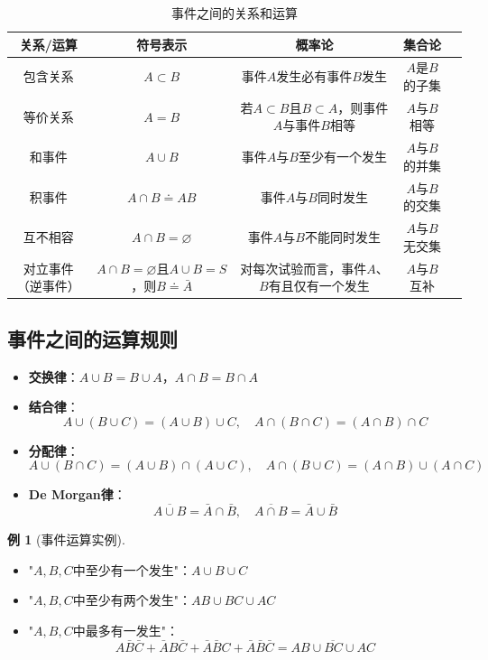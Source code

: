 \documentclass[11pt,a4paper]{report}
\theoremstyle{definition}
\newtheorem{example}{例}[chapter]
\theoremstyle{plain}
\begin{document}
\begin{table}[htbp]
\centering
\caption{事件之间的关系和运算}
\begin{tabular}{@{}ccccc@{}}
\toprule
\textbf{关系/运算} & \textbf{符号表示} & \textbf{概率论} & \textbf{集合论}\\
\midrule
包含关系 & $A\subset B$ & 事件$A$发生必有事件$B$发生 & $A$是$B$的子集\\
等价关系 & $A=B$ & 若$A\subset B$且$B\subset A$，则事件$A$与事件$B$相等 & $A$与$B$相等\\
和事件 & $A\cup B$ & 事件$A$与$B$至少有一个发生 & $A$与$B$的并集\\
积事件 & $A\cap B\doteq AB$ & 事件$A$与$B$同时发生 & $A$与$B$的交集\\
互不相容 & $A\cap B=\varnothing$ & 事件$A$与$B$不能同时发生 & $A$与$B$无交集\\
对立事件（逆事件） & $A\cap B=\varnothing$且$A\cup B=S$，则$B\doteq\bar{A}$ & 对每次试验而言，事件$A$、$B$有且仅有一个发生 & $A$与$B$互补\\
\bottomrule
\end{tabular}
\end{table}

\subsection{事件之间的运算规则}

\begin{itemize}[leftmargin=2em]
    \item \textbf{交换律}：$A\cup B=B\cup A$，$A\cap B=B\cap A$
    \item \textbf{结合律}：
    \[
    A\cup(B\cup C)=(A\cup B)\cup C,\quad A\cap(B\cap C)=(A\cap B)\cap C
    \]
    \item \textbf{分配律}：
    \[
    A\cup(B\cap C)=(A\cup B)\cap(A\cup C),\quad A\cap(B\cup C)=(A\cap B)\cup(A\cap C)
    \]
    \item \textbf{De Morgan律}：
    \[
    \overline{A\cup B}=\bar{A}\cap\bar{B},\quad \overline{A\cap B}=\bar{A}\cup\bar{B}
    \]
\end{itemize}

\begin{example}[事件运算实例]
\begin{itemize}[leftmargin=2em]
    \item "$A,B,C$中至少有一个发生"：$A\cup B\cup C$
    \item "$A,B,C$中至少有两个发生"：$AB\cup BC\cup AC$
    \item "$A,B,C$中最多有一发生"：
    \[
    A\bar{B}\bar{C}+\bar{A}B\bar{C}+\bar{A}\bar{B}C+\bar{A}\bar{B}\bar{C}=\overline{AB\cup BC\cup AC}
    \]
\end{itemize}
\end{example}
\end{document}

